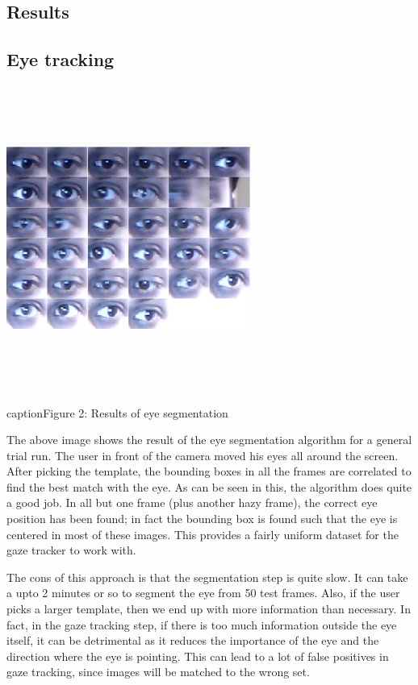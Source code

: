\documentclass[12pt,letterpaper]{article}
\begin{document}
\newpage

\begin{multicols}{2}


\section{Results}
\label{scn:results}

\subsection{Eye tracking}
\label{scn:results-eyetrack}

\includegraphics[width=80mm,height=100mm]{segmentEyes.png}

caption{Figure 2: Results of eye segmentation}

\medskip
The above image shows the result of the eye segmentation algorithm for a general trial run. The user in
front of the camera moved his eyes all around the screen. After picking the template, the bounding boxes
in all the frames are correlated to find the best match with the eye. As can be seen in this, the 
algorithm does quite a good job. In all but one frame (plus another hazy frame), the correct eye position 
has been found; in fact the bounding box is found such that the eye is centered in most of these images. 
This provides a fairly uniform dataset for the gaze tracker to work with. 

The cons of this approach is that the segmentation step is quite slow. It can take a upto 2 minutes or so
to segment the eye from 50 test frames. Also, if the user picks a larger template, then we end up with more 
information than necessary. In fact, in the gaze tracking step, if there is too much information outside 
the eye itself, it can be detrimental as it reduces the importance of the eye and the direction where
the eye is pointing. This can lead to a lot of false positives in gaze tracking, since images will be
matched to the wrong set. 


\end{multicols}
\end{document}

